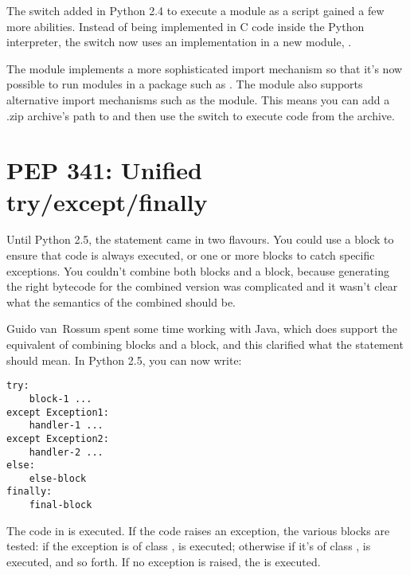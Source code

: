\documentclass{howto}
\begin{document}
The  switch added in Python 2.4 to execute a module as
a script gained a few more abilities.  Instead of being implemented in
C code inside the Python interpreter, the switch now uses an
implementation in a new module, .

The  module implements a more sophisticated import
mechanism so that it's now possible to run modules in a package such
as .  The module also supports alternative
import mechanisms such as the  module.  This means
you can add a .zip archive's path to  and then use the
 switch to execute code from the archive.


\begin{seealso}


\end{seealso}


\section{PEP 341: Unified try/except/finally\label{pep-341}}

Until Python 2.5, the  statement came in two
flavours. You could use a  block to ensure that code
is always executed, or one or more  blocks to catch 
specific exceptions.  You couldn't combine both  blocks and a
 block, because generating the right bytecode for the
combined version was complicated and it wasn't clear what the
semantics of the combined should be.  

Guido van~Rossum spent some time working with Java, which does support the
equivalent of combining  blocks and a
 block, and this clarified what the statement should
mean.  In Python 2.5, you can now write:

\begin{verbatim}
try:
    block-1 ...
except Exception1:
    handler-1 ...
except Exception2:
    handler-2 ...
else:
    else-block
finally:
    final-block 
\end{verbatim}

The code in  is executed.  If the code raises an
exception, the various  blocks are tested: if the
exception is of class ,  is executed;
otherwise if it's of class ,  is
executed, and so forth.  If no exception is raised, the
 is executed.  
\end{document}

